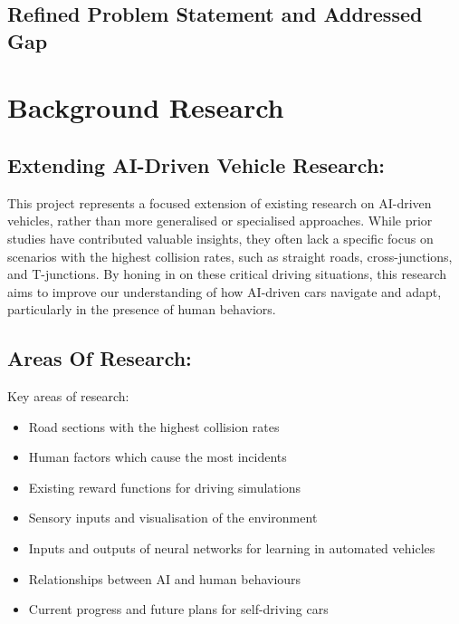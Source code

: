 \documentclass{article}
\begin{document}
\subsection{Refined Problem Statement and Addressed Gap}
\lipsum[2][1]

\section{Background Research}
\lipsum[2][1]

\subsection{Extending AI-Driven Vehicle Research:}
This project represents a focused extension of existing research on AI-driven vehicles, rather than more generalised or specialised approaches. While prior studies have contributed valuable insights, they often lack a specific focus on scenarios with the highest collision rates, such as straight roads, cross-junctions, and T-junctions. By honing in on these critical driving situations, this research aims to improve our understanding of how AI-driven cars navigate and adapt, particularly in the presence of human behaviors. 

\subsection{Areas Of Research:}
Key areas of research:
\begin{itemize}
    \item Road sections with the highest collision rates \cite{accident-types-and-causes}
    \item Human factors which cause the most incidents \cite{accident-types-and-causes} \cite{gov-crash-stats} \cite{Crash-human-causes}
    \item Existing reward functions for driving simulations \cite{Predictive-reward-function-for-ai-driving} \cite{Racing-reward-functions} \cite{Deep-RL-for-racing-driving} 
    \item Sensory inputs and visualisation of the environment \cite{General-overview-of-ai-driving}
    \item Inputs and outputs of neural networks for learning in automated vehicles \cite{Collision-avoidance-in-lane-free-traffic-neural-system} \cite{Deep-RL-for-AI-driving-general-overview}
    \item Relationships between AI and human behaviours \cite{Collision-frequency-ai-and-humans} 
    \item Current progress and future plans for self-driving cars \cite{Deep-learning-for-AI-driving}
\end{itemize}
\end{document}
